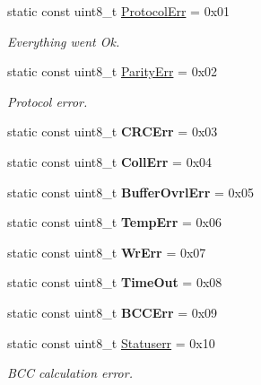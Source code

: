 \begin{DoxyCompactItemize}
\mbox{\label{classMFRC522_a6c50a079169f7765026e54b94a6a97a8}} 
static const uint8\+\_\+t \hyperlink{classMFRC522_a6c50a079169f7765026e54b94a6a97a8}{Protocol\+Err} = 0x01
\begin{DoxyCompactList}\small\item\em Everything went Ok. \end{DoxyCompactList}\item 
\mbox{\label{classMFRC522_a6e6c56ee1d07e961a1dea963fea4df99}} 
static const uint8\+\_\+t \hyperlink{classMFRC522_a6e6c56ee1d07e961a1dea963fea4df99}{Parity\+Err} = 0x02
\begin{DoxyCompactList}\small\item\em Protocol error. \end{DoxyCompactList}\item 
\mbox{\label{classMFRC522_aa711e6b2b73c4f42262678bd7b551a12}} 
static const uint8\+\_\+t {\bfseries C\+R\+C\+Err} = 0x03
\item 
\mbox{\label{classMFRC522_afebf0772f64954ce203b4140b5db09fd}} 
static const uint8\+\_\+t {\bfseries Coll\+Err} = 0x04
\item 
\mbox{\label{classMFRC522_a3ff93285d827a9d20914470bf6c284ab}} 
static const uint8\+\_\+t {\bfseries Buffer\+Ovrl\+Err} = 0x05
\item 
\mbox{\label{classMFRC522_a8ba339caf47ffbfef993542df5109023}} 
static const uint8\+\_\+t {\bfseries Temp\+Err} = 0x06
\item 
\mbox{\label{classMFRC522_a2b9f725730e12abdf9f50f78b297a0ff}} 
static const uint8\+\_\+t {\bfseries Wr\+Err} = 0x07
\item 
\mbox{\label{classMFRC522_a64932294752fa585ccce83f181a32422}} 
static const uint8\+\_\+t {\bfseries Time\+Out} = 0x08
\item 
\mbox{\label{classMFRC522_ac055e977aabadd176e9feaa96ffcf700}} 
static const uint8\+\_\+t {\bfseries B\+C\+C\+Err} = 0x09
\item 
\mbox{\label{classMFRC522_a60ea9e92461662d294c83cf2e156f5ad}} 
static const uint8\+\_\+t \hyperlink{classMFRC522_a60ea9e92461662d294c83cf2e156f5ad}{Statuserr} = 0x10
\begin{DoxyCompactList}\small\item\em B\+CC calculation error. \end{DoxyCompactList}\end{DoxyCompactItemize}


